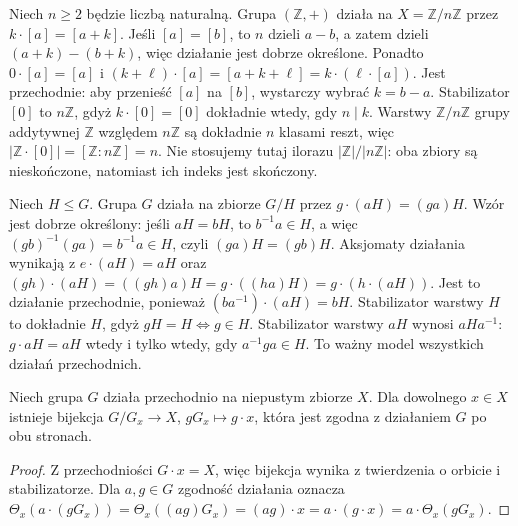 \begin{przyklad}
\label{aa:prz:z-dziala-na-zn}
Niech $n\ge2$ będzie liczbą naturalną.
Grupa $(\mathbb Z,+)$ działa na $X=\mathbb Z/n\mathbb Z$
przez $k\cdot[a]=[a+k]$.
Jeśli $[a]=[b]$, to $n$ dzieli $a-b$, a zatem dzieli
$(a+k)-(b+k)$, więc działanie jest dobrze określone.
Ponadto $0\cdot[a]=[a]$ i
$(k+\ell)\cdot[a]=[a+k+\ell]=k\cdot(\ell\cdot[a])$.
Jest przechodnie: aby przenieść $[a]$ na $[b]$, wystarczy
wybrać $k=b-a$.
Stabilizator $[0]$ to $n\mathbb Z$, gdyż
$k\cdot[0]=[0]$ dokładnie wtedy, gdy $n\mid k$.
Warstwy $\mathbb Z/n\mathbb Z$ grupy addytywnej
$\mathbb Z$ względem $n\mathbb Z$ są dokładnie $n$
klasami reszt, więc
$|\mathbb Z\cdot[0]|=[\mathbb Z:n\mathbb Z]=n$.
Nie stosujemy tutaj ilorazu $|\mathbb Z|/|n\mathbb Z|$:
oba zbiory są nieskończone, natomiast ich indeks jest skończony.
\end{przyklad}

\begin{przyklad}
\label{aa:prz:akcja-kosety}
Niech $H\le G$. Grupa $G$ działa na zbiorze $G/H$
przez $g\cdot(aH)=(ga)H$.
Wzór jest dobrze określony: jeśli $aH=bH$, to
$b^{-1}a\in H$, a więc
$(gb)^{-1}(ga)=b^{-1}a\in H$, czyli $(ga)H=(gb)H$.
Aksjomaty działania wynikają z
$e\cdot(aH)=aH$ oraz
$(gh)\cdot(aH)=((gh)a)H=g\cdot((ha)H)
=g\cdot(h\cdot(aH))$.
Jest to działanie przechodnie, ponieważ
$(ba^{-1})\cdot(aH)=bH$.
Stabilizator warstwy $H$ to dokładnie $H$, gdyż
$gH=H\iff g\in H$.
Stabilizator warstwy $aH$ wynosi $aHa^{-1}$:
$g\cdot aH=aH$ wtedy i tylko wtedy, gdy
$a^{-1}ga\in H$.
To ważny model wszystkich działań przechodnich.
\end{przyklad}

\begin{wniosek}
\label{aa:wn:przechodnie-warstwy}
Niech grupa $G$ działa przechodnio na niepustym zbiorze $X$.
Dla dowolnego $x\in X$ istnieje bijekcja
$G/G_x\to X$, $gG_x\mapsto g\cdot x$,
która jest zgodna z działaniem $G$ po obu stronach.
\end{wniosek}
\begin{proof}
Z przechodniości $G\cdot x=X$, więc bijekcja wynika
z twierdzenia o orbicie i stabilizatorze.
Dla $a,g\in G$ zgodność działania oznacza
$\Theta_x(a\cdot(gG_x))=\Theta_x((ag)G_x)
=(ag)\cdot x=a\cdot(g\cdot x)=a\cdot\Theta_x(gG_x)$.
\end{proof}

